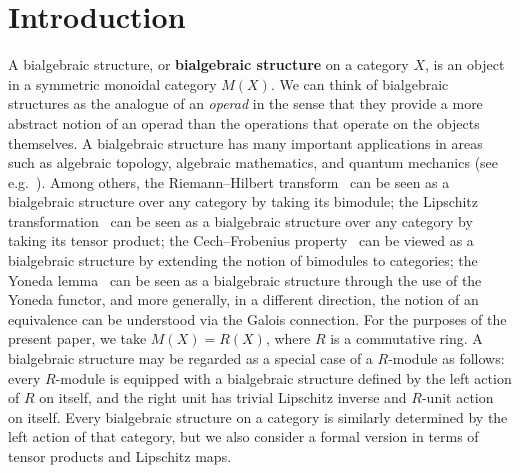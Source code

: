 \documentclass[a4paper,reqno,oneside]{article}
\begin{document}
\section*{Introduction}  
\label{sec:introduction} 
A bialgebraic structure, or \textbf{bialgebraic structure} on a category $X$, is an object in a symmetric monoidal category $M(X)$. We can think of bialgebraic structures as the analogue of an \textit{operad} in the sense that they provide a more abstract notion of an operad than the operations that operate on the objects themselves. A bialgebraic structure has many important applications in areas such as algebraic topology, algebraic mathematics, and quantum mechanics (see e.g.~\cite{emerie2008algebraic}). Among others, the Riemann--Hilbert transform~\cite{riemannhilbert} can be seen as a bialgebraic structure over any category by taking its bimodule; the Lipschitz transformation~\cite{lipschitz} can be seen as a bialgebraic structure over any category by taking its tensor product; the Cech--Frobenius property~\cite{cecenhof} can be viewed as a bialgebraic structure by extending the notion of bimodules to categories; the Yoneda lemma~\cite{yonedayymm} can be seen as a bialgebraic structure through the use of the Yoneda functor, and more generally, in a different direction, the notion of an equivalence can be understood via the Galois connection. For the purposes of the present paper, we take $M(X)=R(X)$, where $R$ is a commutative ring. A bialgebraic structure may be regarded as a special case of a $R$-module as follows: every $R$-module is equipped with a bialgebraic structure defined by the left action of $R$ on itself, and the right unit has trivial Lipschitz inverse and $R$-unit action on itself. Every bialgebraic structure on a category is similarly determined by the left action of that category, but we also consider a formal version in terms of tensor products and Lipschitz maps.
\end{document}
